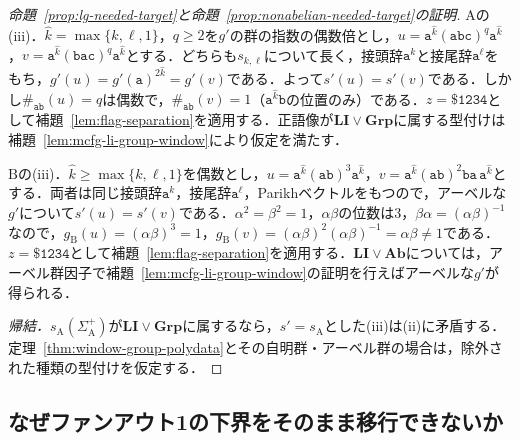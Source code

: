 \documentclass[11pt,a4paper]{ltjsarticle}
\numberwithin{equation}{section}
\theoremstyle{plain}
\theoremstyle{definition}
\theoremstyle{remark}
\begin{document}
\begin{proof}[命題~\ref{prop:lg-needed-target}と命題~\ref{prop:nonabelian-needed-target}の証明]
$\mathrm A$の(iii)．$\hat k=\max\{k,\ell,1\}$，$q\ge2$を$g'$の群の指数の偶数倍とし，$u=\mathtt a^{\hat k}(\mathtt{abc})^q\mathtt a^{\hat k}$，$v=\mathtt a^{\hat k}(\mathtt{bac})^q\mathtt a^{\hat k}$とする．どちらも$s_{k,\ell}$について長く，接頭辞$\mathtt a^k$と接尾辞$\mathtt a^\ell$をもち，$g'(u)=g'(\mathtt a)^{2\hat k}=g'(v)$である．よって$s'(u)=s'(v)$である．しかし$\#_{\mathtt{ab}}(u)=q$は偶数で，$\#_{\mathtt{ab}}(v)=1$（$\mathtt a^{\hat k}\mathtt b$の位置のみ）である．$z=\mathtt{\$1234}$として補題~\ref{lem:flag-separation}を適用する．正語像が$\mathbf{LI}\vee\mathbf{Grp}$に属する型付けは補題~\ref{lem:mcfg-li-group-window}により仮定を満たす．

$\mathrm B$の(iii)．$\hat k\ge\max\{k,\ell,1\}$を偶数とし，$u=\mathtt a^{\hat k}(\mathtt{ab})^3\mathtt a^{\hat k}$，$v=\mathtt a^{\hat k}(\mathtt{ab})^2\mathtt{ba}\,\mathtt a^{\hat k}$とする．両者は同じ接頭辞$\mathtt a^k$，接尾辞$\mathtt a^\ell$，Parikhベクトルをもつので，アーベルな$g'$について$s'(u)=s'(v)$である．$\alpha^2=\beta^2=1$，$\alpha\beta$の位数は3，$\beta\alpha=(\alpha\beta)^{-1}$なので，$g_{\mathrm B}(u)=(\alpha\beta)^3=1$，$g_{\mathrm B}(v)=(\alpha\beta)^2(\alpha\beta)^{-1}=\alpha\beta\ne1$である．$z=\mathtt{\$1234}$として補題~\ref{lem:flag-separation}を適用する．$\mathbf{LI}\vee\mathbf{Ab}$については，アーベル群因子で補題~\ref{lem:mcfg-li-group-window}の証明を行えばアーベルな$g'$が得られる．

\emph{帰結．}$s_{\mathrm A}(\Sigma_{\mathrm A}^+)$が$\mathbf{LI}\vee\mathbf{Grp}$に属するなら，$s'=s_{\mathrm A}$とした(iii)は(ii)に矛盾する．定理~\ref{thm:window-group-polydata}とその自明群・アーベル群の場合は，除外された種類の型付けを仮定する．
\end{proof}

\subsection{なぜファンアウト1の下界をそのまま移行できないか}
\label{subsec:power-transfer}
\end{document}
